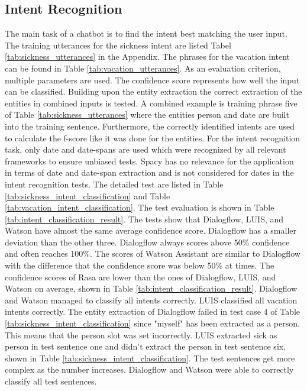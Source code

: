\subsection*{Intent Recognition}
The main task of a chatbot is to find the intent best matching the user input.
The training utterances for the sickness intent are listed Tabel \ref{tab:sickness_utterances}
in the Appendix.
The phrases for the vacation intent can be found in Table \ref{tab:vacation_utterances}.
As an evaluation criterion, multiple parameters are used.
The confidence score represents how well the input can be classified.
Building upon the entity extraction the correct extraction of the entities in combined inputs is tested. 
A combined example is training phrase five of Table \ref{tab:sickness_utterances} 
where the entities person and date are built into the training sentence.
Furthermore, the correctly identified intents are used to calculate the f-score 
like it was done for the entities.
For the intent recognition task, only date and date-spans are used which
were recognized by all relevant frameworks to ensure unbiased tests.
Spacy has no relevance for the application in terms of date and date-span
extraction and is not considered for dates in the intent recognition tests.
The detailed test are listed in Table \ref{tab:sickness_intent_classification} and 
Table \ref{tab:vacation_intent_classification}.
The test evaluation is shown in Table \ref{tab:intent_classification_result}.
The tests show that Dialogflow, LUIS, and Watson have almost the same average 
confidence score. 
Dialogflow has a smaller deviation than the other three.
Dialogflow always scores above 50\% confidence and often reaches 100\%.
The scores of Watson Assistant are similar to Dialogflow with the difference 
that the confidence score was below 50\% at times.
The confidence scores of Rasa are lower than the ones of Dialogflow, LUIS, and Watson on 
average, shown in 
Table \ref{tab:intent_classification_result}.
Dialogflow and Watson managed to classify all intents correctly.
LUIS classified all vacation intents correctly.
The entity extraction of Dialogflow failed in test case 4 of 
Table \ref{tab:sickness_intent_classification} since "myself" has been extracted as a person.
This means that the person slot was set incorrectly.
LUIS extracted sick as person in test sentence one and didn't extract the person in test sentence six, shown in 
Table \ref{tab:sickness_intent_classification}.
The test sentences get more complex as the number increases.
Dialogflow and Watson were able to correctly classify all test sentences.
